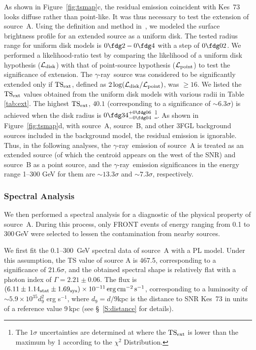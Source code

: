\documentclass[12pt,preprint]{aastex}
\newcommand{\E}[1]{\times 10^{#1}}
\newcommand{\cm}{\,{\rm cm}}    \newcommand{\km}{\,{\rm km}}
\newcommand{\du}{d_{9}} \newcommand{\Du}{D_{20}}
\newcommand{\gray}{{\rm $\gamma$-ray}}
\begin{document}
As shown in Figure~\ref{fig:tsmap}c, the residual emission coincident with Kes~73
looks  diffuse rather than point-like.
It was thus necessary to test the extension of source~A.
Using the definition and method in~\citet{Lande2012extend}, 
we modeled the surface brightness profile for an extended source as a uniform disk.
The tested radius range for uniform disk models is $0\fdg2-0\fdg4$ 
with a step of $0\fdg02$.
We performed a likelihood-ratio test
by comparing the likelihood of a uniform disk hypothesis 
(${\mathcal L}_{\rm disk}$) 
with that of point-source hypothesis 
(${\mathcal L}_{\rm point}$)
to test the significance of extension.
The \gray\ source was  considered to be significantly extended 
only if ${\rm TS}_{\rm ext}$, defined as 
$2\log({\mathcal L}_{\rm disk}/{\mathcal L}_{\rm point})$, 
was $\geq16$. 
We listed the ${\rm TS}_{\rm ext}$ values 
obtained from the uniform disk models with 
various radii in Table \ref{tab:ext}.
The highest ${\rm TS}_{\rm ext}$, $40.1$ 
(corresponding to a significance of $\sim 6.3\sigma$)
is achieved when the disk radius is $0\fdg34^{+0\fdg06}_{-0\fdg04}$
\footnote{The $1\sigma$ uncertainties are determined at where the ${\rm TS}_{\rm ext}$ 
is lower than the maximum by 1 according to the $\chi^{2}$ Distribution.}.
As shown in Figure~\ref{fig:tsmap}d, with source~A, source~B,
and other 3FGL background sources included in the background model, 
the residual emission is ignorable. 
Thus, in the following analyses, the \gray\ emission of source~A
is treated as an extended source (of which the centroid appears
on the west of the SNR)  and source~B as a point source, and
the \gray\ emission significances in  the energy range 1--300 GeV for them
are  $\sim 13.3\sigma$ and $\sim 7.3\sigma$, respectively.





\subsubsection{Spectral Analysis}
\label{subsec:spec}

We then performed a spectral analysis for a diagnostic of the
physical property of source~A.
During this process, only FRONT events 
of energy ranging from 0.1 to 300\,GeV were selected 
to lessen the contamination from nearby sources.

We first fit the 0.1--300~GeV spectral data 
of source~A with a PL model. %
Under this assumption, the TS value of source A  is 467.5,
corresponding to a significance of $21.6\sigma$,
and the  obtained spectral shape is relatively flat
with a photon index of $\Gamma=2.21\pm0.06$.
The flux is $(6.11\pm1.14_{\rm stat}\pm1.69_{\rm sys})\E{-11}
\,\mbox{erg}\cm^{-2}\ps$, corresponding to a luminosity
of $\sim5.9\times 10^{35}\du^2$ erg s$^{-1}$, 
where $\du=d/9$kpc is the distance to SNR Kes~73 
in units of a reference value 9\,kpc
(see \S~\ref{S:distance} for details).
\end{document}

